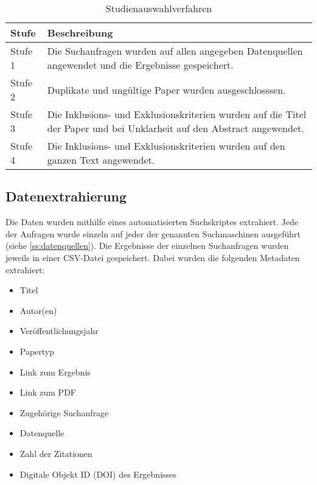 \documentclass[conference,compsoc,ngerman]{IEEEtran}
\begin{document}
\begin{table}[h]
	\caption{Studienauswahlverfahren}
	\label{tabelle:auswahlverfahren}
\begin{tabular}{p{1cm}|p{6.5cm}}

	Stufe & Beschreibung \\
	\hline	
	Stufe 1 & Die Suchanfragen wurden auf allen angegeben Datenquellen angewendet und die Ergebnisse gespeichert.\\
	
	Stufe 2 & Duplikate und ungültige Paper wurden ausgeschlosssen.\\
	
	Stufe 3 & Die Inklusions- und Exklusionskriterien wurden auf die Titel der Paper und bei Unklarheit auf den Abstract angewendet. \\
	
	
	Stufe 4 & Die Inklusions- und Exklusionskriterien wurden auf den ganzen Text angewendet.
	
\end{tabular}
\end{table}


\subsection{Datenextrahierung}
Die Daten wurden mithilfe eines automatisierten Suchskriptes extrahiert.
Jede der Anfragen wurde einzeln auf jeder der genannten Suchmaschinen ausgeführt (siehe \cref{ss:datenquellen}). Die Ergebnisse der einzelnen Suchanfragen wurden jeweils in einer CSV-Datei gespeichert.
Dabei wurden die folgenden Metadaten extrahiert:

\begin{itemize}
	\item Titel
	\item Autor(en)
	\item Veröffentlichungsjahr
	\item Papertyp
	\item Link zum Ergebnis
	\item Link zum PDF
	\item Zugehörige Suchanfrage
	\item Datenquelle
	\item Zahl der Zitationen
	\item Digitale Objekt ID (DOI) des Ergebnisses
\end{itemize}
\end{document}
